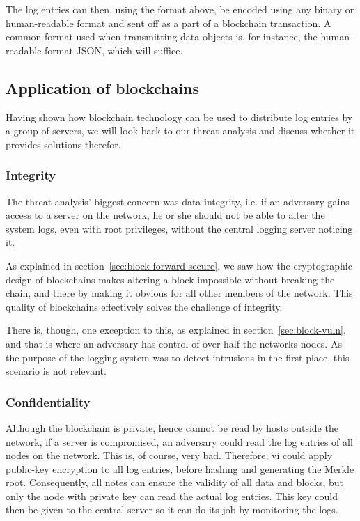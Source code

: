 The log entries can then, using the format above, be encoded using any
binary or human-readable format and sent off as a part of a blockchain
transaction. A common format used when transmitting data objects is,
for instance, the human-readable format JSON, which will suffice.


\subsection{Application of blockchains}
Having shown how blockchain technology can be used to distribute log
entries by a group of servers, we will look back to our threat
analysis and discuss whether it provides solutions therefor.

\subsubsection{Integrity}
The threat analysis' biggest concern was data integrity, i.e. if an
adversary gains access to a server on the network, he or she should
not be able to alter the system logs, even with root privileges,
without the central logging server noticing it.

As explained in section~\ref{sec:block-forward-secure}, we saw how the
cryptographic design of blockchains makes altering a block impossible
without breaking the chain, and there by making it obvious for all
other members of the network. This quality of blockchains effectively
solves the challenge of integrity.

There is, though, one exception to this, as explained in
section~\ref{sec:block-vuln}, and that is where an adversary has
control of over half the networks nodes. As the purpose of the logging
system was to detect intrusions in the first place, this scenario is
not relevant.

\subsubsection{Confidentiality}
Although the blockchain is private, hence cannot be read by hosts
outside the network, if a server is compromised, an adversary could
read the log entries of all nodes on the network. This is, of course,
very bad. Therefore, vi could apply public-key encryption to all log
entries, before hashing and generating the Merkle root. Consequently,
all notes can ensure the validity of all data and blocks, but only the
node with private key can read the actual log entries. This key could
then be given to the central server so it can do its job by monitoring
the logs.


